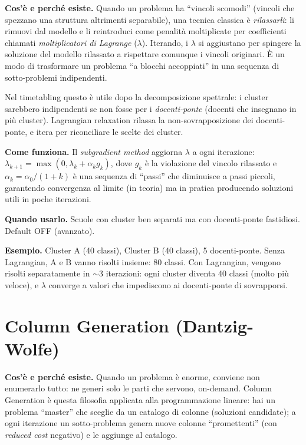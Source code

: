 \textbf{Cos'\`e e perch\'e esiste.} Quando un problema ha
``vincoli scomodi'' (vincoli che spezzano una struttura
altrimenti separabile), una tecnica classica \`e
\emph{rilassarli}: li rimuovi dal modello e li reintroduci
come penalit\`a moltiplicate per coefficienti chiamati
\emph{moltiplicatori di Lagrange} ($\lambda$). Iterando, i
$\lambda$ si aggiustano per spingere la soluzione del modello
rilassato a rispettare comunque i vincoli originari. \`E un
modo di trasformare un problema ``a blocchi accoppiati'' in
una sequenza di sotto-problemi indipendenti.

Nel timetabling questo \`e utile dopo la decomposizione
spettrale: i cluster sarebbero indipendenti se non fosse per
i \emph{docenti-ponte} (docenti che insegnano in pi\`u
cluster). Lagrangian relaxation rilassa la non-sovrapposizione
dei docenti-ponte, e itera per riconciliare le scelte dei
cluster.

\textbf{Come funziona.} Il \emph{subgradient method} aggiorna
$\lambda$ a ogni iterazione: $\lambda_{k+1} = \max(0, \lambda_k +
\alpha_k g_k)$, dove $g_k$ \`e la violazione del vincolo
rilassato e $\alpha_k = \alpha_0/(1+k)$ \`e una sequenza di
``passi'' che diminuisce a passi piccoli, garantendo
convergenza al limite (in teoria) ma in pratica producendo
soluzioni utili in poche iterazioni.

\textbf{Quando usarlo.} Scuole con cluster ben separati ma
con docenti-ponte fastidiosi. Default OFF (avanzato).

\textbf{Esempio.} Cluster A (40 classi), Cluster B (40
classi), 5 docenti-ponte. Senza Lagrangian, A e B vanno
risolti insieme: 80 classi. Con Lagrangian, vengono
risolti separatamente in $\sim$3 iterazioni: ogni cluster
diventa 40 classi (molto pi\`u veloce), e $\lambda$ converge
a valori che impediscono ai docenti-ponte di sovrapporsi.

\section{Column Generation (Dantzig-Wolfe)}

\textbf{Cos'\`e e perch\'e esiste.} Quando un problema \`e
enorme, conviene non enumerarlo tutto: ne generi solo le
parti che servono, on-demand. Column Generation \`e questa
filosofia applicata alla programmazione lineare: hai un
problema ``master'' che sceglie da un catalogo di colonne
(soluzioni candidate); a ogni iterazione un sotto-problema
genera nuove colonne ``promettenti'' (con \emph{reduced cost}
negativo) e le aggiunge al catalogo.


